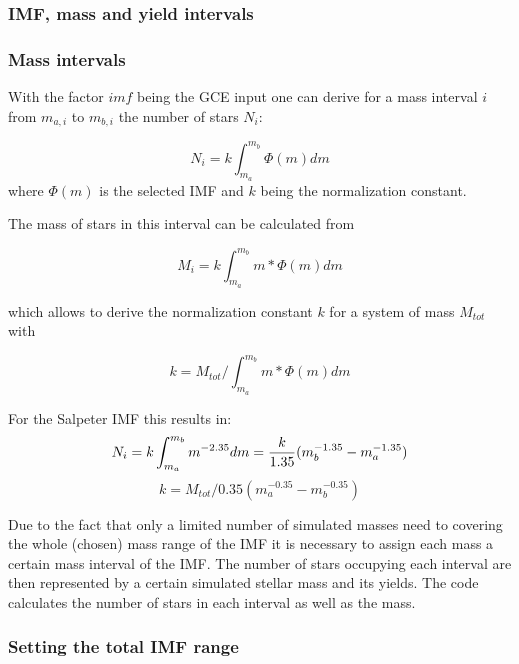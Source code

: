\subsubsection{IMF, mass and yield intervals}

\subsubsection{Mass intervals}

With the factor $imf$ being the GCE input one can derive for a mass interval $i$
from $m_{a,i}$ to $m_{b,i}$ the number of stars $N_i$:


\begin{equation}
N_i = k \int_{m_a}^{m_b} \Phi(m) dm
\end{equation}
where $\Phi(m)$ is the selected IMF and
$k$ being the normalization constant. 

The mass of stars in this interval can be calculated from

\begin{equation}
M_i = k \int_{m_a}^{m_b} m*\Phi(m) dm
\label{eq:imf}
\end{equation}

which allows to derive the normalization constant $k$
for a system of mass $M_{tot}$ with 

\begin{equation}
k = M_{tot} / \int_{m_a}^{m_b} m*\Phi(m) dm
\label{eq:imf}
\end{equation}

For the Salpeter IMF this results in:
\begin{equation}
N_i = k \int_{m_a}^{m_b} m^{-2.35} dm = \frac{k}{1.35} ( m_b^{-1.35} - m_a^{-1.35} ) \\
\end{equation}
\begin{equation}
k = M_{tot} /  {0.35} ( m_a^{-0.35} - m_b^{-0.35} )
\end{equation}



Due to the fact that only a limited number of simulated masses
need to covering the whole (chosen) mass range of the IMF it is necessary
to assign each mass a certain mass interval of the IMF.
The number of stars occupying each interval are then represented
by a certain simulated stellar mass and its yields.
The code calculates the number of stars in each interval as well as
the mass.

\subsubsection{Setting the total IMF range}

